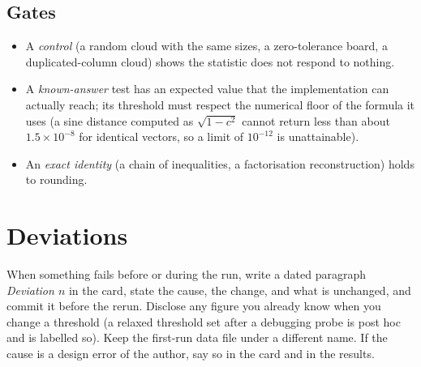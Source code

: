 \documentclass[11pt,a4paper]{article}
\begin{document}
\subsection*{Gates}
\begin{itemize}
\item A \emph{control} (a random cloud with the same sizes, a zero-tolerance board, a duplicated-column cloud) shows the statistic does not respond to nothing.
\item A \emph{known-answer} test has an expected value that the implementation can actually reach; its threshold must respect the numerical floor of the formula it uses (a sine distance computed as $\sqrt{1-c^2}$ cannot return less than about $1.5\times10^{-8}$ for identical vectors, so a limit of $10^{-12}$ is unattainable).
\item An \emph{exact identity} (a chain of inequalities, a factorisation reconstruction) holds to rounding.
\end{itemize}

\section{Deviations}
When something fails before or during the run, write a dated paragraph \emph{Deviation $n$} in the card, state the cause, the change, and what is unchanged, and commit it before the rerun. Disclose any figure you already know when you change a threshold (a relaxed threshold set after a debugging probe is post hoc and is labelled so).
Keep the first-run data file under a different name. If the cause is a design error of the author, say so in the card and in the results.
\end{document}
